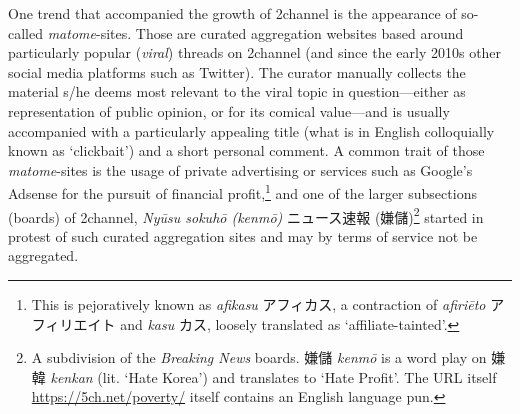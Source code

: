 \documentclass[10pt,british,A4paper,,openany]{memoir}
\begin{document}
One trend that accompanied the growth of 2channel is the appearance of
so-called \emph{matome}-sites. Those are curated aggregation websites
based around particularly popular (\emph{viral}) threads on 2channel
(and since the early 2010s other social media platforms such as
Twitter). The curator manually collects the material s/he deems most
relevant to the viral topic in question---either as representation of
public opinion, or for its comical value---and is usually accompanied
with a particularly appealing title (what is in English colloquially
known as `clickbait') and a short personal comment. A common trait of
those \emph{matome}-sites is the usage of private advertising or
services such as Google's Adsense for the pursuit of financial
profit,\footnote{This is pejoratively known as \emph{afikasu}
  アフィカス, a contraction of \emph{afiriēto} アフィリエイト and
  \emph{kasu} カス, loosely translated as `affiliate-tainted'.} and one
of the larger subsections (boards) of 2channel, \emph{Nyūsu sokuhō
(kenmō)} ニュース速報 (嫌儲)\footnote{A subdivision of the
  \emph{Breaking News} boards. 嫌儲 \emph{kenmō} is a word play on 嫌韓
  \emph{kenkan} (lit. `Hate Korea') and translates to `Hate Profit'. The
  URL itself \url{https://5ch.net/poverty/} itself contains an English
  language pun.} started in protest of such curated aggregation sites
and may by terms of service not be aggregated.
\end{document}
